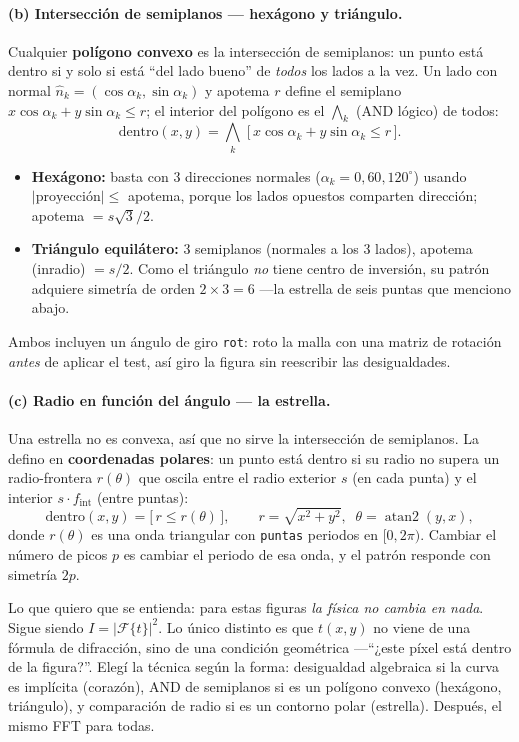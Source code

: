 \documentclass[11pt,a4paper]{article}
\newcommand{\Fou}{\mathcal{F}}
\begin{document}
\paragraph{(b) Intersección de semiplanos --- hexágono y triángulo.}
Cualquier \textbf{polígono convexo} es la intersección de semiplanos: un punto está
dentro si y solo si está ``del lado bueno'' de \emph{todos} los lados a la vez. Un
lado con normal $\hat n_k=(\cos\alpha_k,\sin\alpha_k)$ y apotema $r$ define el
semiplano $x\cos\alpha_k+y\sin\alpha_k\le r$; el interior del polígono es el
$\bigwedge_k$ (AND lógico) de todos:
\[
\text{dentro}(x,y)=\bigwedge_{k}\;\big[\,x\cos\alpha_k+y\sin\alpha_k\le r\,\big].
\]
\begin{itemize}[leftmargin=1.4em]
\item \textbf{Hexágono:} basta con 3 direcciones normales ($\alpha_k=0,60,120^\circ$)
usando $|\text{proyección}|\le$ apotema, porque los lados opuestos comparten
dirección; apotema $=s\sqrt3/2$.
\item \textbf{Triángulo equilátero:} 3 semiplanos (normales a los 3 lados),
apotema (inradio) $=s/2$. Como el triángulo \emph{no} tiene centro de inversión,
su patrón adquiere simetría de orden $2\times3=6$ ---la estrella de seis puntas
que menciono abajo.
\end{itemize}
Ambos incluyen un ángulo de giro \texttt{rot}: roto la malla con una matriz de
rotación \emph{antes} de aplicar el test, así giro la figura sin reescribir las
desigualdades.

\paragraph{(c) Radio en función del ángulo --- la estrella.}
Una estrella no es convexa, así que no sirve la intersección de semiplanos. La
defino en \textbf{coordenadas polares}: un punto está dentro si su radio no supera
un radio-frontera $r(\theta)$ que oscila entre el radio exterior $s$ (en cada
punta) y el interior $s\cdot f_\text{int}$ (entre puntas):
\[
\text{dentro}(x,y)=\big[\,r\le r(\theta)\,\big],\qquad
r=\sqrt{x^2+y^2},\;\;\theta=\operatorname{atan2}(y,x),
\]
donde $r(\theta)$ es una onda triangular con \texttt{puntas} periodos en
$[0,2\pi)$. Cambiar el número de picos $p$ es cambiar el periodo de esa onda, y el
patrón responde con simetría $2p$.

\begin{decir}
Lo que quiero que se entienda: para estas figuras \emph{la física no cambia en
nada}. Sigue siendo $I=|\Fou\{t\}|^2$. Lo único distinto es que $t(x,y)$ no viene
de una fórmula de difracción, sino de una condición geométrica ---``¿este píxel
está dentro de la figura?''. Elegí la técnica según la forma: desigualdad
algebraica si la curva es implícita (corazón), AND de semiplanos si es un polígono
convexo (hexágono, triángulo), y comparación de radio si es un contorno polar
(estrella). Después, el mismo FFT para todas.
\end{decir}
\end{document}
